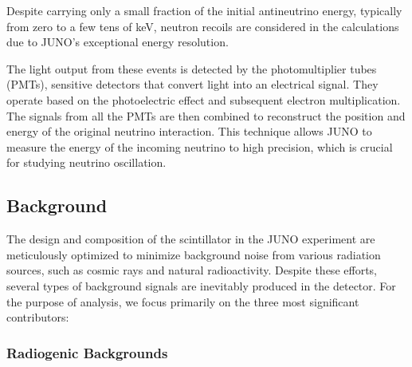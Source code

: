 Despite carrying only a small fraction of the initial antineutrino energy, typically from zero to a few tens of keV, neutron recoils are considered in the calculations due to JUNO's exceptional energy resolution.

The light output from these events is detected by the photomultiplier tubes (PMTs), sensitive detectors that convert light into an electrical signal. They operate based on the photoelectric effect and subsequent electron multiplication. The signals from all the PMTs are then combined to reconstruct the position and energy of the original neutrino interaction. This technique allows JUNO to measure the energy of the incoming neutrino to high precision, which is crucial for studying neutrino oscillation. %


\subsection{Background}
The design and composition of the scintillator in the JUNO experiment are meticulously optimized to minimize background noise from various radiation sources, such as cosmic rays and natural radioactivity. Despite these efforts, several types of background signals are inevitably produced in the detector. For the purpose of analysis, we focus primarily on the three most significant contributors:


\subsubsection*{Radiogenic Backgrounds}


